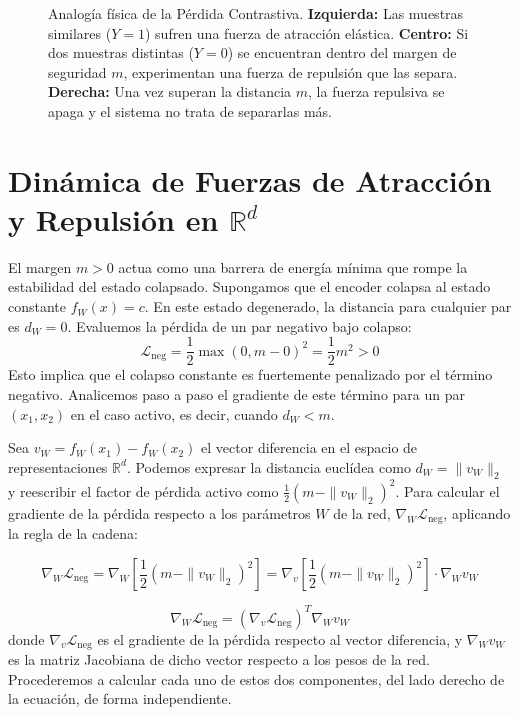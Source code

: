 \begin{figure}[H]
\caption{Analogía física de la Pérdida Contrastiva. \textbf{Izquierda:} Las muestras similares ($Y=1$) sufren una fuerza de atracción elástica. \textbf{Centro:} Si dos muestras distintas ($Y=0$) se encuentran dentro del margen de seguridad $m$, experimentan una fuerza de repulsión que las separa. \textbf{Derecha:} Una vez superan la distancia $m$, la fuerza repulsiva se apaga y el sistema no trata de separarlas más.}
\label{fig:contrastive_forces}
\end{figure}

\section{Dinámica de Fuerzas de Atracción y Repulsión en $\mathbb{R}^d$}
\label{sec:fuerzas_latentes}

El margen $m > 0$ actua como una barrera de energía mínima que rompe la estabilidad del estado colapsado.
Supongamos que el encoder colapsa al estado constante $f_W(x) = c$. En este estado degenerado, la distancia para cualquier par es $d_W = 0$. Evaluemos la pérdida de un par negativo bajo colapso:
\begin{equation}
\mathcal{L}_{\text{neg}} = \frac{1}{2} \max(0, m - 0)^2 = \frac{1}{2} m^2 > 0
\end{equation}
Esto implica que el colapso constante es fuertemente penalizado por el término negativo. Analicemos paso a paso el gradiente de este término para un par $(x_1, x_2)$ en el caso activo, es decir, cuando $d_W < m$.

Sea $v_W = f_W(x_1) - f_W(x_2)$ el vector diferencia en el espacio de representaciones $\mathbb{R}^d$. Podemos expresar la distancia euclídea como $d_W = \|v_W\|_2$ y reescribir el factor de pérdida activo como $\frac{1}{2} (m - \|v_W\|_2)^2$. Para calcular el gradiente de la pérdida respecto a los parámetros $W$ de la red, $\nabla_W \mathcal{L}_{\text{neg}}$, aplicando la regla de la cadena:

\begin{equation}
\nabla_W \mathcal{L}_{\text{neg}} = \nabla_W \left[ \frac{1}{2} (m - \|v_W\|_2)^2 \right] = \nabla_{v} \left[\frac{1}{2} (m - \|v_W\|_2)^2 \right] \cdot \nabla_W v_W
\end{equation}


\begin{equation}
\nabla_W \mathcal{L}_{\text{neg}} = \left( \nabla_{v} \mathcal{L}_{\text{neg}} \right)^T \nabla_W v_W
\end{equation}
donde $\nabla_{v} \mathcal{L}_{\text{neg}}$ es el gradiente de la pérdida respecto al vector diferencia, y $\nabla_W v_W$ es la matriz Jacobiana de dicho vector respecto a los pesos de la red. Procederemos a calcular cada uno de estos dos componentes, del lado derecho de la ecuación, de forma independiente.

